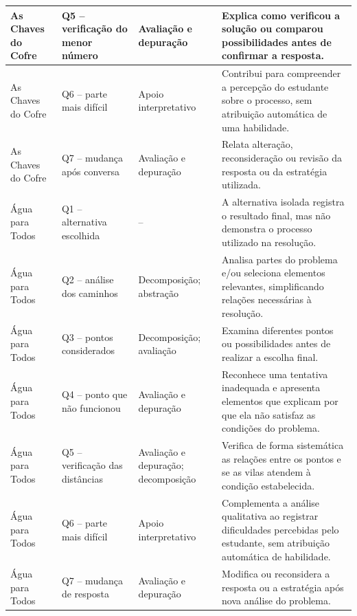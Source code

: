 {\begin{xltabular}{\textwidth}{
    |>{\raggedright\arraybackslash}p{2.6cm}
    |>{\raggedright\arraybackslash}p{3.2cm}
    |>{\raggedright\arraybackslash}p{3.5cm}
    |>{\raggedright\arraybackslash}X|}
    As Chaves do Cofre &
    Q5 -- verificação do menor número &
    Avaliação e depuração &
    Explica como verificou a solução ou comparou possibilidades antes de confirmar a resposta. \\
    \hline

    As Chaves do Cofre &
    Q6 -- parte mais difícil &
    Apoio interpretativo &
    Contribui para compreender a percepção do estudante sobre o processo, sem atribuição automática de uma habilidade. \\
    \hline

    As Chaves do Cofre &
    Q7 -- mudança após conversa &
    Avaliação e depuração &
    Relata alteração, reconsideração ou revisão da resposta ou da estratégia utilizada. \\
    \hline

    Água para Todos &
    Q1 -- alternativa escolhida &
    -- &
    A alternativa isolada registra o resultado final, mas não demonstra o processo utilizado na resolução. \\
    \hline

    Água para Todos &
    Q2 -- análise dos caminhos &
    Decomposição; abstração &
    Analisa partes do problema e/ou seleciona elementos relevantes, simplificando relações necessárias à resolução. \\
    \hline

    Água para Todos &
    Q3 -- pontos considerados &
    Decomposição; avaliação &
    Examina diferentes pontos ou possibilidades antes de realizar a escolha final. \\
    \hline

    Água para Todos &
    Q4 -- ponto que não funcionou &
    Avaliação e depuração &
    Reconhece uma tentativa inadequada e apresenta elementos que explicam por que ela não satisfaz as condições do problema. \\
    \hline

    Água para Todos &
    Q5 -- verificação das distâncias &
    Avaliação e depuração; decomposição &
    Verifica de forma sistemática as relações entre os pontos e se as vilas atendem à condição estabelecida. \\
    \hline

    Água para Todos &
    Q6 -- parte mais difícil &
    Apoio interpretativo &
    Complementa a análise qualitativa ao registrar dificuldades percebidas pelo estudante, sem atribuição automática de habilidade. \\
    \hline

    Água para Todos &
    Q7 -- mudança de resposta &
    Avaliação e depuração &
    Modifica ou reconsidera a resposta ou a estratégia após nova análise do problema. \\
    \hline


\end{xltabular}}
